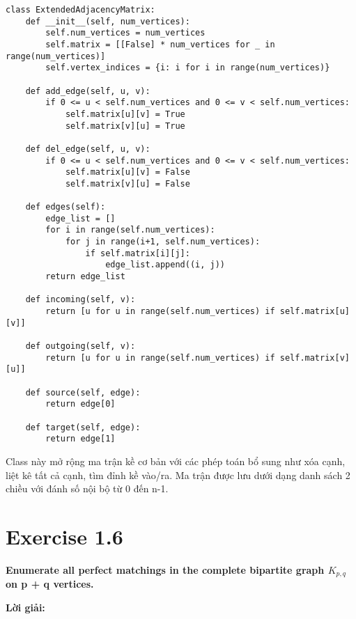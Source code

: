 \documentclass[12pt]{article}
\begin{document}
\begin{lstlisting}
class ExtendedAdjacencyMatrix:
    def __init__(self, num_vertices):
        self.num_vertices = num_vertices
        self.matrix = [[False] * num_vertices for _ in range(num_vertices)]
        self.vertex_indices = {i: i for i in range(num_vertices)}
    
    def add_edge(self, u, v):
        if 0 <= u < self.num_vertices and 0 <= v < self.num_vertices:
            self.matrix[u][v] = True
            self.matrix[v][u] = True
    
    def del_edge(self, u, v):
        if 0 <= u < self.num_vertices and 0 <= v < self.num_vertices:
            self.matrix[u][v] = False
            self.matrix[v][u] = False
    
    def edges(self):
        edge_list = []
        for i in range(self.num_vertices):
            for j in range(i+1, self.num_vertices):
                if self.matrix[i][j]:
                    edge_list.append((i, j))
        return edge_list
    
    def incoming(self, v):
        return [u for u in range(self.num_vertices) if self.matrix[u][v]]
    
    def outgoing(self, v):
        return [u for u in range(self.num_vertices) if self.matrix[v][u]]
    
    def source(self, edge):
        return edge[0]
    
    def target(self, edge):
        return edge[1]
\end{lstlisting}

Class này mở rộng ma trận kề cơ bản với các phép toán bổ sung như xóa cạnh, liệt kê tất cả cạnh, tìm đỉnh kề vào/ra. Ma trận được lưu dưới dạng danh sách 2 chiều với đánh số nội bộ từ 0 đến n-1.

\section{Exercise 1.6}
\textbf{Enumerate all perfect matchings in the complete bipartite graph $K_{p,q}$ on p + q vertices.}

\textbf{Lời giải:}
\end{document}
